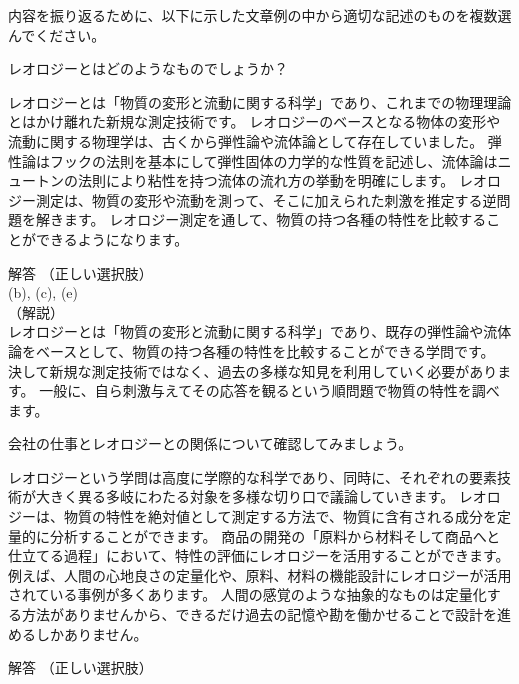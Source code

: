 \documentclass[uplatex,dvipdfmx,a4paper,11pt]{jsarticle}
\begin{document}
内容を振り返るために、以下に示した文章例の中から適切な記述のものを複数選んでください。
\begin{qlist}
	\qitem レオロジーとはどのようなものでしょうか？
		\begin{qlist2}
			\qitem レオロジーとは「物質の変形と流動に関する科学」であり、これまでの物理理論とはかけ離れた新規な測定技術です。
			\qitem レオロジーのベースとなる物体の変形や流動に関する物理学は、古くから弾性論や流体論として存在していました。
			\qitem 弾性論はフックの法則を基本にして弾性固体の力学的な性質を記述し、流体論はニュートンの法則により粘性を持つ流体の流れ方の挙動を明確にします。
			\qitem レオロジー測定は、物質の変形や流動を測って、そこに加えられた刺激を推定する逆問題を解きます。
			\qitem レオロジー測定を通して、物質の持つ各種の特性を比較することができるようになります。
    \end{qlist2}
    \vspace{3mm}
    \begin{itembox}[l]{解答}
        （正しい選択肢）\\
        (b), (c), (e)\\
        （解説）\\
        レオロジーとは「物質の変形と流動に関する科学」であり、既存の弾性論や流体論をベースとして、物質の持つ各種の特性を比較することができる学問です。
        決して新規な測定技術ではなく、過去の多様な知見を利用していく必要があります。
        一般に、自ら刺激与えてその応答を観るという順問題で物質の特性を調べます。
    \end{itembox}
	\qitem 会社の仕事とレオロジーとの関係について確認してみましょう。
		\begin{qlist2}
			\qitem レオロジーという学問は高度に学際的な科学であり、同時に、それぞれの要素技術が大きく異る多岐にわたる対象を多様な切り口で議論していきます。
			\qitem レオロジーは、物質の特性を絶対値として測定する方法で、物質に含有される成分を定量的に分析することができます。
			\qitem 商品の開発の「原料から材料そして商品へと仕立てる過程」において、特性の評価にレオロジーを活用することができます。
            \qitem 例えば、人間の心地良さの定量化や、原料、材料の機能設計にレオロジーが活用されている事例が多くあります。
            \qitem 人間の感覚のような抽象的なものは定量化する方法がありませんから、できるだけ過去の記憶や勘を働かせることで設計を進めるしかありません。
    \end{qlist2}
    \vspace{3mm}
    \begin{itembox}[l]{解答}
        （正しい選択肢）\\

\end{itembox}
\end{qlist}
\end{document}
